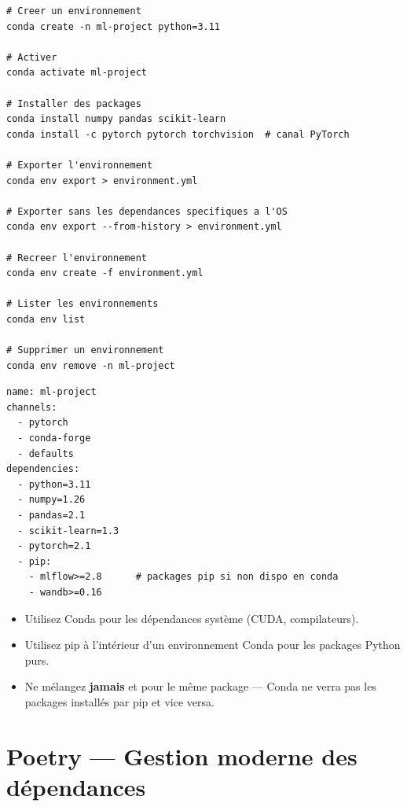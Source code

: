 \begin{codeblock}[title=\textbf{Commandes Conda essentielles}]
\begin{verbatim}
# Creer un environnement
conda create -n ml-project python=3.11

# Activer
conda activate ml-project

# Installer des packages
conda install numpy pandas scikit-learn
conda install -c pytorch pytorch torchvision  # canal PyTorch

# Exporter l'environnement
conda env export > environment.yml

# Exporter sans les dependances specifiques a l'OS
conda env export --from-history > environment.yml

# Recreer l'environnement
conda env create -f environment.yml

# Lister les environnements
conda env list

# Supprimer un environnement
conda env remove -n ml-project
\end{verbatim}
\end{codeblock}

\begin{codeblock}[title=\textbf{environment.yml}]
\begin{verbatim}
name: ml-project
channels:
  - pytorch
  - conda-forge
  - defaults
dependencies:
  - python=3.11
  - numpy=1.26
  - pandas=2.1
  - scikit-learn=1.3
  - pytorch=2.1
  - pip:
    - mlflow>=2.8      # packages pip si non dispo en conda
    - wandb>=0.16
\end{verbatim}
\end{codeblock}

\begin{bonnepratique}[title=\textbf{Conda vs pip}]
\begin{itemize}
  \item Utilisez Conda pour les d\'ependances syst\`eme (CUDA, compilateurs).
  \item Utilisez pip \`a l'int\'erieur d'un environnement Conda pour les
    packages Python purs.
  \item Ne m\'elangez \textbf{jamais}  et 
    pour le m\^eme package --- Conda ne verra pas les packages install\'es
    par pip et vice versa.
\end{itemize}
\end{bonnepratique}

\section{Poetry --- Gestion moderne des d\'ependances}
\label{sec:poetry}

